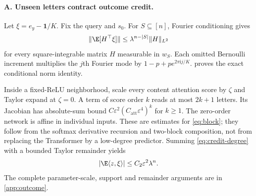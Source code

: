 \paragraph{A. Unseen letters contract outcome credit.}
Let $\xi=e_y-\mathbf1/K$. Fix the query and $s_0$. For $S\subseteq[n]$, Fourier conditioning gives
\begin{equation}\label{eq:credit-degree}
\|\E[H^\top\xi]\|\le\lambda^{n-|S|}\|H\|_{L^2}
\end{equation}
for every square-integrable matrix $H$ measurable in $w_S$. Each omitted Bernoulli increment multiplies the $j$th Fourier mode by $1-p+p e^{2\pi\mathrm i j/K}$.  proves the exact conditional norm identity.

Inside a fixed-ReLU neighborhood, scale every content attention score by $\zeta$ and Taylor expand at $\zeta=0$. A term of score order $k$ reads at most $2k+1$ letters. Its Jacobian has absolute-sum bound $C\varepsilon^2(C_{\mathrm{att}}\varepsilon^4)^k$ for $k\ge1$. The zero-order network is affine in individual inputs. These are estimates for \cref{eq:block}; they follow from the softmax derivative recursion and two-block composition, not from replacing the Transformer by a low-degree predictor. Summing \cref{eq:credit-degree} with a bounded Taylor remainder yields
\[
|\E\langle z,\xi\rangle|\le C_2\varepsilon^2\lambda^n.
\]
The complete parameter-scale, support and remainder arguments are in \cref{app:outcome}.

